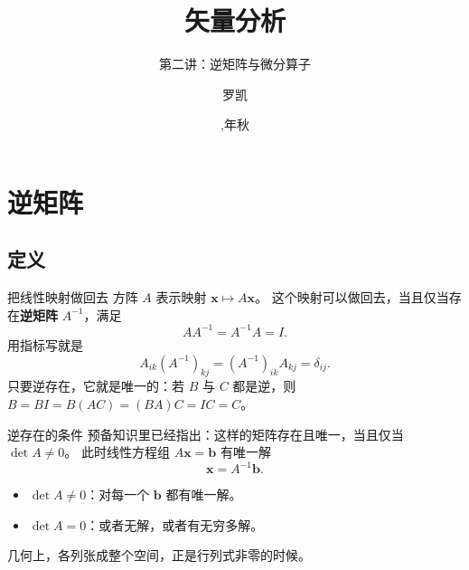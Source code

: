\documentclass[fontset=windows, chinese, 10pt, xcolor=dvipsnames]{beamer}
\title{矢量分析}
\subtitle{第二讲：逆矩阵与微分算子}
\date{\zhdigits{\the\year},\zhganzhinian{\the\year}年秋}
\author{罗凯}
\institute{南京理工大学物理学院}
\begin{document}
\begin{frame}
  \titlepage
\end{frame}


\begin{frame}
  \titlepage
\end{frame}


\section{逆矩阵}

\subsection{定义}

\begin{frame}{把线性映射做回去}
  方阵 $A$ 表示映射 $\mathbf{x}\mapsto A\mathbf{x}$。
  这个映射可以做回去，当且仅当存在\textbf{逆矩阵} $A^{-1}$，满足
  \begin{equation*}
    AA^{-1}=A^{-1}A=I.
  \end{equation*}
  用指标写就是
  \begin{equation*}
    A_{ik}(A^{-1})_{kj}
    =(A^{-1})_{ik}A_{kj}
    =\delta_{ij}.
  \end{equation*}
  只要逆存在，它就是唯一的：若 $B$ 与 $C$ 都是逆，则
  $B=BI=B(AC)=(BA)C=IC=C$。
\end{frame}

\begin{frame}{逆存在的条件}
  预备知识里已经指出：这样的矩阵存在且唯一，当且仅当 $\det A\neq 0$。
  此时线性方程组 $A\mathbf{x}=\mathbf{b}$ 有唯一解
  \begin{equation*}
    \mathbf{x}=A^{-1}\mathbf{b}.
  \end{equation*}
  \begin{itemize}
    \item $\det A\neq 0$：对每一个 $\mathbf{b}$ 都有唯一解。
    \item $\det A=0$：或者无解，或者有无穷多解。
  \end{itemize}
  几何上，各列张成整个空间，正是行列式非零的时候。
\end{frame}
\end{document}
